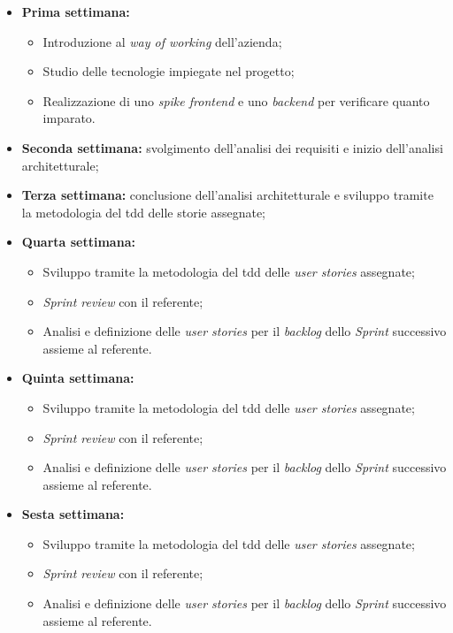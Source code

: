 \begin{itemize}
  \item \textbf{Prima settimana:} 
    \begin{itemize}
      \item Introduzione al \emph{way of working} dell'azienda;
      \item Studio delle tecnologie impiegate nel progetto;
      \item Realizzazione di uno \emph{spike \gls{frontend}} e uno \emph{\gls{backend}} per verificare quanto imparato.
    \end{itemize}
  \item \textbf{Seconda settimana:} svolgimento dell'analisi dei requisiti e inizio dell'analisi architetturale;
  \item \textbf{Terza settimana:} conclusione dell'analisi architetturale e sviluppo tramite la metodologia del \acrshort{tdd} delle storie assegnate;
  \item \textbf{Quarta settimana:} 
    \begin{itemize}
      \item Sviluppo tramite la metodologia del \acrshort{tdd} delle \emph{user stories} assegnate;
      \item \emph{Sprint review} con il referente;
      \item Analisi e definizione delle \emph{user stories} per il \emph{backlog} dello \emph{Sprint} successivo assieme al referente.
    \end{itemize}
  \item \textbf{Quinta settimana:} 
    \begin{itemize}
      \item Sviluppo tramite la metodologia del \acrshort{tdd} delle \emph{user stories} assegnate;
      \item \emph{Sprint review} con il referente;
      \item Analisi e definizione delle \emph{user stories} per il \emph{backlog} dello \emph{Sprint} successivo assieme al referente.
    \end{itemize}
  \item \textbf{Sesta settimana:} 
    \begin{itemize}
      \item Sviluppo tramite la metodologia del \acrshort{tdd} delle \emph{user stories} assegnate;
      \item \emph{Sprint review} con il referente;
      \item Analisi e definizione delle \emph{user stories} per il \emph{backlog} dello \emph{Sprint} successivo assieme al referente.

\end{itemize}
\end{itemize}
